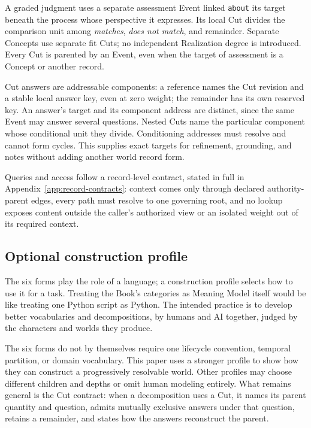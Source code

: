 \documentclass[11pt,a4paper]{article}
\begin{document}
A graded judgment uses a separate assessment Event linked \texttt{about} its
target beneath the process whose perspective it expresses. Its local Cut
divides the comparison unit among \emph{matches}, \emph{does not match}, and
remainder. Separate Concepts use separate fit Cuts; no independent Realization
degree is introduced. Every Cut is parented by an Event, even when the target
of assessment is a Concept or another record.

Cut answers are addressable components: a reference names the Cut revision and
a stable local answer key, even at zero weight; the remainder has its own
reserved key. An answer's
target and its component address are distinct, since the same Event may answer
several questions. Nested Cuts name the particular component whose conditional
unit they divide. Conditioning addresses must resolve and cannot form cycles.
This supplies exact targets for refinement, grounding, and notes without adding
another world record form.

Queries and access follow a record-level contract, stated in full in
Appendix~\ref{app:record-contracts}: context comes only through declared
authority-parent edges, every path must resolve to one governing root, and no
lookup exposes content outside the caller's authorized view or an isolated
weight out of its required context.

\subsection{Optional construction profile}
\label{sec:construction-profile}

The six forms play the role of a language; a construction profile selects how
to use it for a task. Treating the Book's categories as Meaning Model itself
would be like treating one Python script as Python. The intended practice is
to develop better vocabularies and decompositions, by humans and AI together,
judged by the characters and worlds they produce.

The six forms do not by themselves require one lifecycle convention, temporal
partition, or domain vocabulary. This paper uses a stronger profile to show how
they can construct a progressively resolvable world. Other profiles may choose
different children and depths or omit human modeling entirely. What remains
general is the Cut contract: when a decomposition uses a Cut, it names its
parent quantity and question, admits mutually exclusive answers under that question, retains a
remainder, and states how the answers reconstruct the parent.
\end{document}
